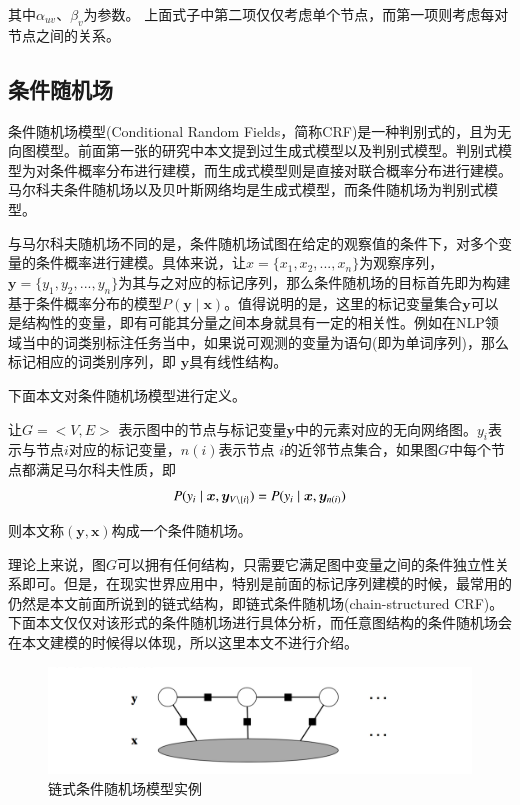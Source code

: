 其中$\alpha_{uv}$、$\beta_v$为参数。 上面式子中第二项仅仅考虑单个节点，而第一项则考虑每对节点之间的关系。



\subsection{条件随机场}
条件随机场模型(Conditional Random Fields，简称CRF)是一种判别式的，且为无向图模型。前面第一张的研究中本文提到过生成式模型以及判别式模型。判别式模型为对条件概率分布进行建模，而生成式模型则是直接对联合概率分布进行建模。马尔科夫条件随机场以及贝叶斯网络均是生成式模型，而条件随机场为判别式模型。


与马尔科夫随机场不同的是，条件随机场试图在给定的观察值的条件下，对多个变量的条件概率进行建模。具体来说，让$x = \{x_1, x_2,...,x_n\}$为观察序列，$\bm{y} = \{y_1, y_2,...,y_n\}$为其与之对应的标记序列，那么条件随机场的目标首先即为构建基于条件概率分布的模型$P(\bm{y} \mid \bm{x})$。值得说明的是，这里的标记变量集合$\bm{y}$可以是结构性的变量，即有可能其分量之间本身就具有一定的相关性。例如在NLP领域当中的词类别标注任务当中，如果说可观测的变量为语句(即为单词序列)，那么标记相应的词类别序列，即 $\bm{y}$具有线性结构。


下面本文对条件随机场模型进行定义。

让$G = <V,E>$ 表示图中的节点与标记变量$\bm{y}$中的元素对应的无向网络图。$y_i$表示与节点$i$对应的标记变量，$n(i)$表示节点
$i$的近邻节点集合，如果图$G$中每个节点都满足马尔科夫性质，即
\begin{equation}
P(y_i \mid \bm{x},\bm{y}_{V \backslash \{i\}}) = P(y_i \mid \bm{x}, \bm{y}_{n(i)}) \\
\end{equation}

则本文称$(\bm{y}, \bm{x})$构成一个条件随机场。


理论上来说，图$G$可以拥有任何结构，只需要它满足图中变量之间的条件独立性关系即可。但是，在现实世界应用中，特别是前面的标记序列建模的时候，最常用的仍然是本文前面所说到的链式结构，即链式条件随机场(chain-structured CRF)。下面本文仅仅对该形式的条件随机场进行具体分析，而任意图结构的条件随机场会在本文建模的时候得以体现，所以这里本文不进行介绍。



\begin{figure}[ht]
    \centering
    \includegraphics[scale=1, width=\textwidth]{figure/linearchain-crf.PNG}
    \caption{链式条件随机场模型实例}
    \label{fig-linear-crf}
\end{figure}


